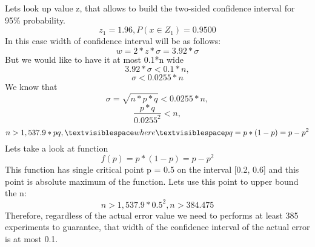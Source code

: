 Lets look up value z, that allows to build the two-sided confidence interval for 95\% probability.
 \[
z_1=1.96, P(x\in Z_1)=0.9500
\]
In this case width of confidence interval will be as follows:
 \[
w = 2*z*\sigma= 3.92*\sigma
\]
But we would like to have it at most 0.1*n wide
 \[
3.92*\sigma<0.1*n,
\]
 \[
\sigma<0.0255*n
\]
We know that
 \[
\sigma=\sqrt{n*p*q}<0.0255*n,
\]
 \[
\frac{p*q}{0.0255^2}<n,
\]
 \[
n>1,537.9*pq,\textvisiblespace where\textvisiblespace pq = p*(1-p)=p - p^2
\]
Lets take a look at function 
 \[
f(p) = p*(1-p)=p - p^2
\]
This function has single critical point p = 0.5 on the interval [0.2, 0.6] and this point is absolute maximum of the function. Lets use this point to upper bound the n:
 \[
n>1,537.9*0.5^2, n>384.475
\]
Therefore, regardless of the actual error value we need to performs at least 385 experiments to guarantee, that width of the confidence interval of the actual error is at most 0.1.
